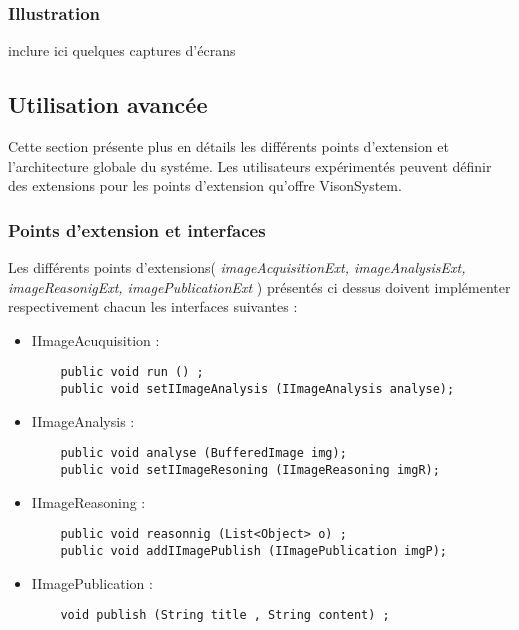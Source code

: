 \documentclass[a4paper , 12pt]{article}
\begin{document}
\subsubsection{Illustration}
inclure ici quelques captures d'écrans 

\subsection{Utilisation avancée}
Cette section présente plus en détails les différents points d'extension et l'architecture globale du systéme. Les utilisateurs expérimentés peuvent définir des extensions pour les points d'extension qu'offre VisonSystem.
\subsubsection{Points d'extension et interfaces} 
Les différents points d'extensions( {\it imageAcquisitionExt, imageAnalysisExt, imageReasonigExt, imagePublicationExt} ) présentés ci dessus doivent implémenter respectivement chacun les interfaces suivantes : 
\begin{itemize}
	\item IImageAcuquisition : 

	\begin{lstlisting}
	public void run () ;
	public void setIImageAnalysis (IImageAnalysis analyse);
	\end{lstlisting}
	\item IImageAnalysis : 
	\begin{lstlisting}
	public void analyse (BufferedImage img);
	public void setIImageResoning (IImageReasoning imgR);
	\end{lstlisting}

	\item IImageReasoning :
	\begin{lstlisting}
	public void reasonnig (List<Object> o) ;
	public void addIImagePublish (IImagePublication imgP);
	\end{lstlisting}

	\item IImagePublication :
	\begin{lstlisting}
	void publish (String title , String content) ;
	\end{lstlisting}


\end{itemize}
\end{document}
